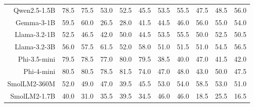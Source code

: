 \begin{table}[t]
{\begin{tabular}{rccccc|ccccc}
Qwen2.5-1.5B & \cellcolor[HTML]{DDEBD2}78.5 & \cellcolor[HTML]{E0ECD2}75.5 & \cellcolor[HTML]{FCF1CD}53.0 & \cellcolor[HTML]{FDF1CC}52.5 & \cellcolor[HTML]{FDECCC}45.5 & \cellcolor[HTML]{E2ECD1}53.5 & \cellcolor[HTML]{DEEBD2}55.5 & \cellcolor[HTML]{EDEECF}47.5 & \cellcolor[HTML]{EBEED0}48.5 & \cellcolor[HTML]{DEEBD2}56.0 \\
Gemma-3-1B & \cellcolor[HTML]{F4F0CE}59.5 & \cellcolor[HTML]{F3F0CE}60.0 & \cellcolor[HTML]{F6D5CC}26.5 & \cellcolor[HTML]{F7D6CC}28.0 & \cellcolor[HTML]{FCE7CC}41.5 & \cellcolor[HTML]{F2EFCE}44.5 & \cellcolor[HTML]{F0EFCF}46.0 & \cellcolor[HTML]{DEEBD2}56.0 & \cellcolor[HTML]{DFEBD2}55.0 & \cellcolor[HTML]{E1ECD2}54.0 \\
Llama-3.2-1B & \cellcolor[HTML]{FDF1CC}52.5 & \cellcolor[HTML]{FEEDCC}46.5 & \cellcolor[HTML]{FCE8CC}42.0 & \cellcolor[HTML]{FFF1CC}50.0 & \cellcolor[HTML]{FDEBCC}44.5 & \cellcolor[HTML]{E2ECD1}53.5 & \cellcolor[HTML]{DEEBD2}55.5 & \cellcolor[HTML]{E8EDD0}50.0 & \cellcolor[HTML]{E4ECD1}52.5 & \cellcolor[HTML]{E7EDD0}50.5 \\
Llama-3.2-3B & \cellcolor[HTML]{F8F1CD}56.0 & \cellcolor[HTML]{F6F0CE}57.5 & \cellcolor[HTML]{F2EFCE}61.5 & \cellcolor[HTML]{FDF2CC}52.0 & \cellcolor[HTML]{F6F0CE}58.0 & \cellcolor[HTML]{E7EDD0}51.0 & \cellcolor[HTML]{E6EDD1}51.5 & \cellcolor[HTML]{E7EDD0}51.0 & \cellcolor[HTML]{E0ECD2}54.5 & \cellcolor[HTML]{DDEBD2}56.5 \\
Phi-3.5-mini & \cellcolor[HTML]{DBEBD3}79.5 & \cellcolor[HTML]{DDEBD2}78.5 & \cellcolor[HTML]{DFEBD2}77.0 & \cellcolor[HTML]{DBEAD3}80.0 & \cellcolor[HTML]{DBEBD3}79.5 & \cellcolor[HTML]{FDF2CC}38.5 & \cellcolor[HTML]{FAF1CD}40.0 & \cellcolor[HTML]{EEEECF}47.0 & \cellcolor[HTML]{F8F0CD}41.5 & \cellcolor[HTML]{F7F0CE}42.0 \\
Phi-4-mini & \cellcolor[HTML]{DAEAD3}80.5 & \cellcolor[HTML]{DAEAD3}80.5 & \cellcolor[HTML]{DDEBD2}78.5 & \cellcolor[HTML]{D9EAD3}81.5 & \cellcolor[HTML]{E2ECD1}74.0 & \cellcolor[HTML]{EEEECF}47.0 & \cellcolor[HTML]{ECEED0}48.0 & \cellcolor[HTML]{F5F0CE}43.0 & \cellcolor[HTML]{E8EDD0}50.0 & \cellcolor[HTML]{EDEECF}47.5 \\
SmolLM2-360M & \cellcolor[HTML]{FDF2CC}52.0 & \cellcolor[HTML]{FEF0CC}49.0 & \cellcolor[HTML]{FEEECC}47.0 & \cellcolor[HTML]{FBE5CC}39.5 & \cellcolor[HTML]{FDECCC}45.5 & \cellcolor[HTML]{E3ECD1}53.0 & \cellcolor[HTML]{E1ECD2}54.0 & \cellcolor[HTML]{D9EAD3}58.5 & \cellcolor[HTML]{E3ECD1}53.0 & \cellcolor[HTML]{E7EDD0}51.0 \\
SmolLM2-1.7B & \cellcolor[HTML]{FBE5CC}40.0 & \cellcolor[HTML]{F8DACC}31.0 & \cellcolor[HTML]{FAE0CC}35.5 & \cellcolor[HTML]{FBE5CC}39.5 & \cellcolor[HTML]{F9DECC}34.5 & \cellcolor[HTML]{F0EFCF}46.0 & \cellcolor[HTML]{F0EFCF}46.0 & \cellcolor[HTML]{F5D0CC}18.5 & \cellcolor[HTML]{F9DCCC}25.5 & \cellcolor[HTML]{F4CCCC}16.5 \\

\end{tabular}}
\end{table}
